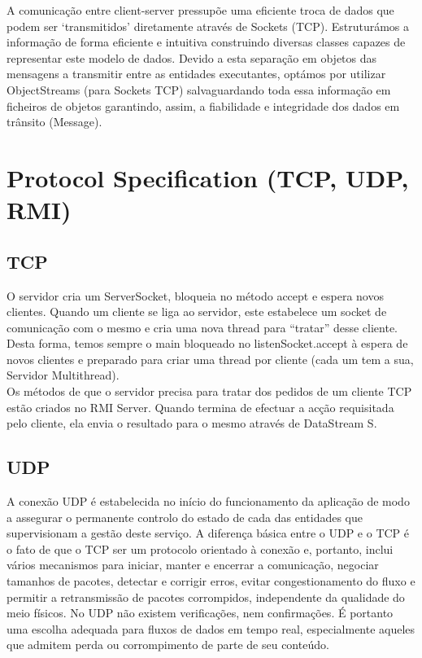 \documentclass[12pt]{article} %
\begin{document}
A comunicação entre client-server pressupõe uma eficiente troca de dados que podem ser ‘transmitidos’ diretamente através de Sockets (TCP). 
Estruturámos a informação de forma eficiente e intuitiva construindo diversas classes capazes de representar este modelo de dados. Devido a esta separação em objetos das mensagens a transmitir entre as entidades executantes, optámos por utilizar ObjectStreams (para Sockets TCP) salvaguardando toda essa informação em ficheiros de objetos garantindo, assim, a fiabilidade e integridade dos dados em trânsito (Message).





\section{Protocol Specification (TCP, UDP, RMI)} %
\label{sec:protocal_specs}

\subsection{TCP}
O servidor cria um ServerSocket, bloqueia no método accept e espera novos clientes. Quando um cliente se liga ao servidor, este estabelece um socket de comunicação com o mesmo e cria uma nova thread para “tratar” desse cliente. Desta forma, temos sempre o main bloqueado no listenSocket.accept à espera de novos clientes e preparado para criar uma thread por cliente (cada um tem a sua, Servidor Multithread).\\
Os métodos de que o servidor precisa para tratar dos pedidos de um cliente TCP estão criados no RMI Server. Quando termina de efectuar a acção requisitada pelo cliente, ela envia o resultado para o mesmo através de DataStream S.


\subsection{UDP}
A conexão UDP é estabelecida no início do funcionamento da aplicação de modo a assegurar o permanente controlo do estado de cada das entidades que supervisionam a gestão deste serviço. A diferença básica entre o UDP e o TCP é o fato de que o TCP ser um protocolo orientado à conexão e, portanto, inclui vários mecanismos para iniciar, manter e encerrar a comunicação, negociar tamanhos de pacotes, detectar e corrigir erros, evitar congestionamento do fluxo e permitir a retransmissão de pacotes corrompidos, independente da qualidade do meio físicos. No UDP não existem verificações, nem confirmações. 
É portanto uma escolha adequada para fluxos de dados em tempo real, especialmente aqueles que admitem perda ou corrompimento de parte de seu conteúdo.
\end{document}
